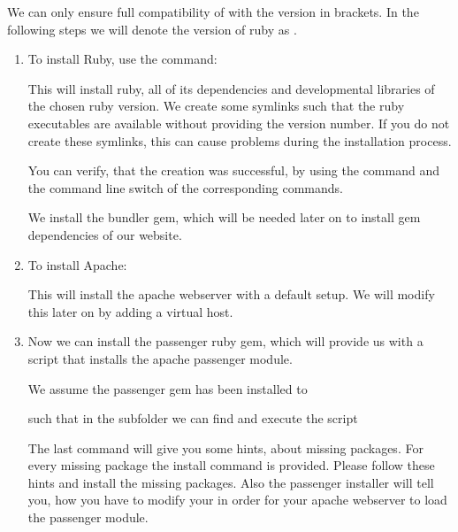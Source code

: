 		 We can only ensure full compatibility of \clusteval with the version in brackets. In the following steps we will denote the version of ruby as \texttt{}.
		 
		 \begin{enumerate}
		 	\item To install Ruby, use the command:
		 	

		 	This will install ruby, all of its dependencies and developmental libraries of the chosen ruby version. 
		 	We create some symlinks such that the ruby executables are available without providing the version number. If you do not create these symlinks, this can cause problems during the installation process.
		 	
		 	
			
			
			You can verify, that the creation was successful, by using the  command and the  command line switch of the corresponding commands.
			
			We install the bundler gem, which will be needed later on to install gem dependencies of our website.
			
			
		 	\item To install Apache:
		 	
		 	
		 	This will install the apache webserver with a default setup. We will modify this later on by adding a virtual host.
		 	
		 	\item Now we can install the passenger ruby gem, which will provide us with a script that installs the apache passenger module.
		 	
		 	
			We assume the passenger gem has been installed to
			
		 	
		 	such that in the subfolder  we can find and execute the script
		 	
			
			The last command will give you some hints, about missing packages. For every missing package the install command is provided. Please follow these hints and install the missing packages. Also the passenger installer will tell you, how you have to modify your  in order for your apache webserver to load the passenger module.
		 \end{enumerate}
		 
